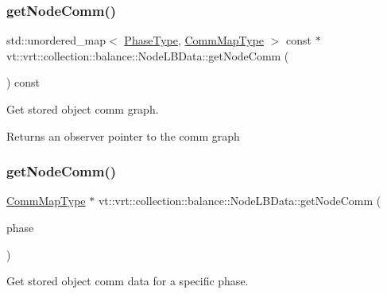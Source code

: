 \subsubsection{\texorpdfstring{get\+Node\+Comm()}{getNodeComm()}\hspace{0.1cm}{\footnotesize\ttfamily [1/2]}}
{\footnotesize\ttfamily std\+::unordered\+\_\+map$<$ \hyperlink{namespacevt_a46ce6733d5cdbd735d561b7b4029f6d7}{Phase\+Type}, \hyperlink{namespacevt_1_1vrt_1_1collection_1_1balance_a01ee1fb0ae2da1d2ab7fdca3be9ae351}{Comm\+Map\+Type} $>$ const  $\ast$ vt\+::vrt\+::collection\+::balance\+::\+Node\+L\+B\+Data\+::get\+Node\+Comm (\begin{DoxyParamCaption}{ }\end{DoxyParamCaption}) const}



Get stored object comm graph. 

\begin{DoxyReturn}{Returns}
an observer pointer to the comm graph 
\end{DoxyReturn}
\mbox{\label{structvt_1_1vrt_1_1collection_1_1balance_1_1_node_l_b_data_a6805869aeb1d424289ddb2b6be653595}} 
\subsubsection{\texorpdfstring{get\+Node\+Comm()}{getNodeComm()}\hspace{0.1cm}{\footnotesize\ttfamily [2/2]}}
{\footnotesize\ttfamily \hyperlink{namespacevt_1_1vrt_1_1collection_1_1balance_a01ee1fb0ae2da1d2ab7fdca3be9ae351}{Comm\+Map\+Type} $\ast$ vt\+::vrt\+::collection\+::balance\+::\+Node\+L\+B\+Data\+::get\+Node\+Comm (\begin{DoxyParamCaption}\item[{\hyperlink{namespacevt_a46ce6733d5cdbd735d561b7b4029f6d7}{Phase\+Type}}]{phase }\end{DoxyParamCaption})}



Get stored object comm data for a specific phase. 


